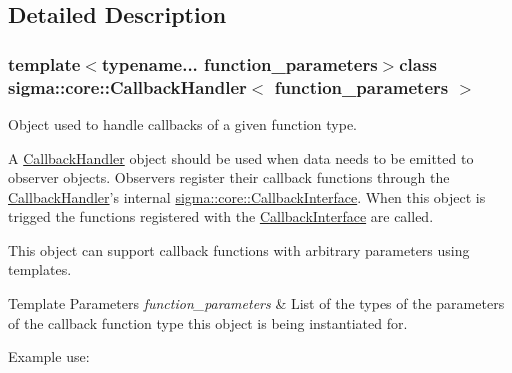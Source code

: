 \subsection{Detailed Description}
\subsubsection*{template$<$typename... function\-\_\-parameters$>$class sigma\-::core\-::\-Callback\-Handler$<$ function\-\_\-parameters $>$}

Object used to handle callbacks of a given function type. 

A \hyperlink{classsigma_1_1core_1_1_callback_handler}{Callback\-Handler} object should be used when data needs to be emitted to observer objects. Observers register their callback functions through the \hyperlink{classsigma_1_1core_1_1_callback_handler}{Callback\-Handler}'s internal \hyperlink{classsigma_1_1core_1_1_callback_interface}{sigma\-::core\-::\-Callback\-Interface}. When this object is trigged the functions registered with the \hyperlink{classsigma_1_1core_1_1_callback_interface}{Callback\-Interface} are called.

This object can support callback functions with arbitrary parameters using templates.


\begin{DoxyTemplParams}{Template Parameters}
{\em function\-\_\-parameters} & List of the types of the parameters of the callback function type this object is being instantiated for.\\
\hline
\end{DoxyTemplParams}
Example use\-:


